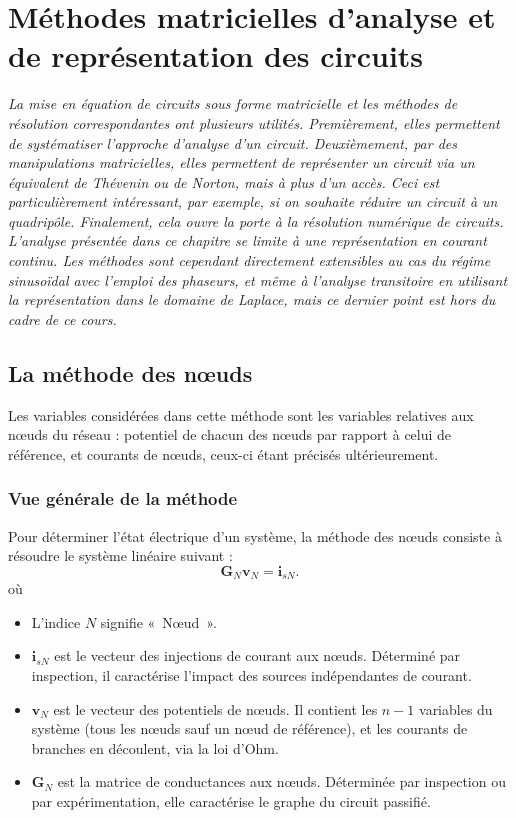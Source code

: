 

\chapter{Méthodes matricielles d'analyse et\\ de représentation des circuits}
\label{sec:methodes-generales}

\textit{La mise en équation de circuits sous forme matricielle et les méthodes de résolution correspondantes ont plusieurs utilités. Premièrement, elles permettent de systématiser l'approche d'analyse d'un circuit. Deuxièmement, par des manipulations matricielles, elles permettent de représenter un circuit via un équivalent de Thévenin ou de Norton, mais à plus d'un accès. Ceci est particulièrement intéressant, par exemple, si on souhaite réduire un circuit à un quadripôle. Finalement, cela ouvre la porte à la résolution numérique de circuits.
L'analyse présentée dans ce chapitre se limite à une représentation en courant continu. Les méthodes sont cependant directement extensibles au cas du régime sinusoïdal avec l'emploi des phaseurs, et même à l'analyse transitoire en utilisant la représentation dans le domaine de Laplace, mais ce dernier point est hors du cadre de ce cours. }

\section{La méthode des nœuds}

Les variables considérées dans cette méthode sont les variables relatives aux nœuds du réseau : potentiel de chacun des nœuds par rapport à celui de référence, et courants de nœuds, ceux-ci étant précisés ultérieurement.

\subsection{Vue générale de la méthode}
Pour déterminer l'état électrique d'un système, la méthode des nœuds consiste à résoudre le système linéaire suivant : 
$$\mathbf{G}_N \mathbf{v}_N = \mathbf{i}_{sN}.$$
où 
\begin{itemize}
\item L'indice $N$ signifie «~Nœud~».
\item $\mathbf{i}_{sN}$ est le vecteur des injections de courant aux nœuds. Déterminé par inspection, il caractérise l'impact des sources indépendantes de courant.
\item $\mathbf{v}_N$ est le vecteur des potentiels de nœuds. Il contient les $n-1$ variables du système (tous les nœuds sauf un nœud de référence), et les courants de branches en découlent, via la loi d'Ohm.
\item $\mathbf{G}_N$ est la matrice de conductances aux nœuds. Déterminée par inspection ou par expérimentation, elle caractérise le graphe du circuit passifié.
\end{itemize}

